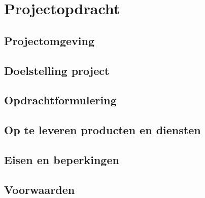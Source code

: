 \section{Projectopdracht}
\subsection{Projectomgeving}
\subsection{Doelstelling project}
\subsection{Opdrachtformulering}
\subsection{Op te leveren producten en diensten}
\subsection{Eisen en beperkingen}
\subsection{Voorwaarden}
